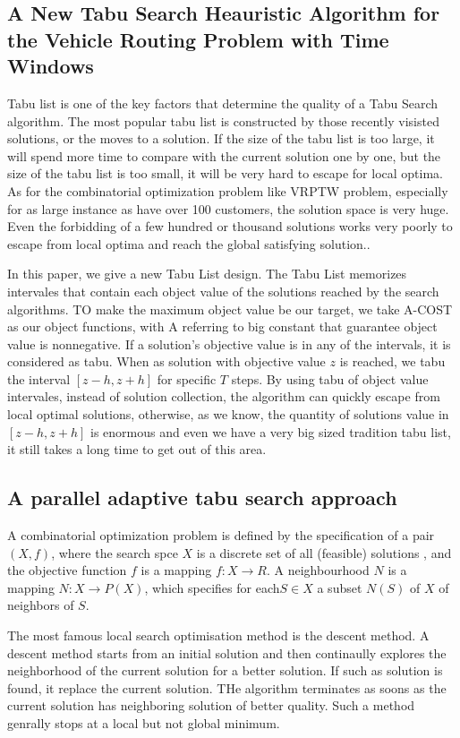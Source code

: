 \subsection{A New Tabu Search Heauristic Algorithm for the Vehicle Routing Problem with Time Windows}
Tabu list is one of the key factors that determine the quality of a Tabu Search algorithm. The most popular tabu list is constructed by those recently visisted solutions, or the moves to a solution. If the size of the tabu list is too large, it will spend more time to compare with the current solution one by one, but the size of the tabu list is too small, it will be very hard to escape for local optima. As for the combinatorial optimization problem like VRPTW problem, especially for as large instance as have over 100 customers, the solution space is very huge. Even the forbidding of a few hundred or thousand solutions works very poorly to escape from local optima and reach the global satisfying solution..

In this paper, we give a new Tabu List design. The Tabu List memorizes intervales that contain each object value of the solutions reached by the search algorithms. TO make the maximum object value be our target, we take A-COST as our object functions, with A referring to big constant that guarantee object value is nonnegative. If a solution's objective value is in any of the intervals, it is considered as tabu. When as solution with objective value $z$ is reached, we tabu the interval $[z-h,z+h]$ for specific $T$ steps. By using tabu of object value intervales, instead of solution collection, the algorithm can quickly escape from local optimal solutions, otherwise, as we know, the quantity of solutions value in $[z-h,z+h]$ is enormous and even we have a very big sized tradition tabu list, it still takes a long time to get out of this area.

\subsection{A parallel adaptive tabu search approach}
A combinatorial optimization problem is defined by the specification of a pair $(X,f)$, where the search spce $X$ is a discrete set of all (feasible) solutions , and the objective function $f$ is a mapping $f \colon X \rightarrow R$. A neighbourhood $N$ is a mapping $N \colon X \rightarrow P(X)$, which specifies for each$S \in X$ a subset $N(S)$ of $X$ of neighbors of $S$.

 The most famous local search optimisation method is the descent method. A descent method starts from an initial solution and then continaully explores the neighborhood of the current solution for a better solution. If such as solution is found, it replace the current solution. THe algorithm terminates as soons as the current solution has neighboring solution of better quality. Such a method genrally stops at a local but not global minimum.

